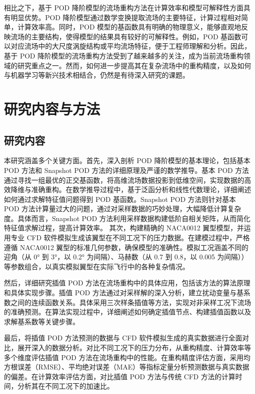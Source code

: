 相比之下，基于 POD 降阶模型的流场重构方法在计算效率和模型可解释性方面具有明显优势。POD 降阶模型通过数学变换提取流场的主要特征，计算过程相对简单，计算效率高\cite{Berkooz1993}。同时，POD 模型的基函数具有明确的物理意义，能够直观地反映流场的主要结构，使得模型的结果具有较好的可解释性\cite{Holmes2012}。例如，POD 基函数可以对应流场中的大尺度涡旋结构或平均流场特征\cite{Lumley2017}，便于工程师理解和分析。因此，基于 POD 降阶模型的流场重构方法受到了越来越多的关注，成为当前流场重构领域的研究重点之一\cite{Taira2020}。然而，如何进一步提高其在复杂流场中的重构精度，以及如何与机器学习等新兴技术相结合\cite{Carlberg2023}，仍然是有待深入研究的课题。
\section{研究内容与方法}
\subsection{研究内容}
本研究涵盖多个关键方面。首先，深入剖析 POD 降阶模型的基本理论，包括基本 POD 方法和 Snapshot POD 方法的详细原理及严谨的数学推导。基本 POD 方法通过寻找一组最优的正交基函数，将高维流场数据投影到低维空间，实现数据的高效降维与准确重构。在数学推导过程中，基于泛函分析和线性代数理论，详细阐述如何通过求解特征值问题得到 POD 基函数。Snapshot POD 方法则针对基本 POD 方法计算量过大的问题，通过对采样数据的巧妙处理，大幅降低计算复杂度。具体而言，Snapshot POD 方法利用采样数据构建低阶自相关矩阵，从而简化特征值求解过程，提高计算效率。
其次，构建精确的 NACA0012 翼型模型，并运用专业 CFD 软件模拟生成该翼型在不同工况下的压力数据。在建模过程中，严格遵循 NACA0012 翼型的标准几何参数，确保模型的准确性。模拟工况涵盖不同的迎角（从 0° 到 3°，以 0.2° 为间隔）、马赫数（从 0.7 到 0.8，以 0.005 为间隔））等参数组合，以真实模拟翼型在实际飞行中的各种复杂情况。

然后，详细研究插值 POD 方法在流场重构中的具体应用，包括该方法的算法原理和具体实现步骤。插值 POD 方法通过对采样解的深入分析，建立扰动变量与基系数之间的连续函数关系。具体采用三次样条插值等方法，实现对非采样工况下流场的准确预测。在算法实现过程中，详细阐述如何确定插值节点、构建插值函数以及求解基系数等关键步骤。

最后，将插值 POD 方法预测的数据与 CFD 软件模拟生成的真实数据进行全面对比，展开深入的数据分析。对比不同工况下的压力分布，从重构精度、计算效率等多个维度评估插值 POD 方法在流场重构中的性能。在重构精度评估方面，采用均方根误差（RMSE）、平均绝对误差（MAE）等指标定量分析预测数据与真实数据的偏差。在计算效率评估方面，对比插值 POD 方法与传统 CFD 方法的计算时间，分析其在不同工况下的加速比。

